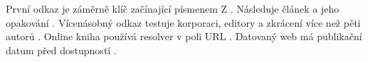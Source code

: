 \documentclass{article}
\begin{document}
První odkaz je záměrně klíč začínající písmenem Z \cite{zeta-book}.
Následuje článek \cite{alpha-article} a jeho opakování \cite{alpha-article}.
Vícenásobný odkaz testuje korporaci, editory a zkrácení více než pěti autorů
\cite{corporate-web,conference-editors,many-authors}.
Online kniha používá resolver v poli URL \cite{online-book}.
Datovaný web má publikační datum před dostupností \cite{dated-web}.



\end{document}
